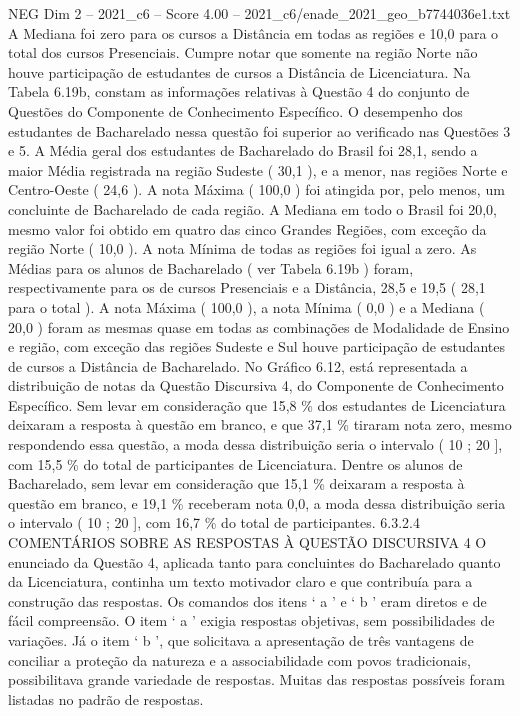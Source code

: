 \begin{textsample}{NEG Dim 2 – 2021\_c6 – Score 4.00 – 2021\_c6/enade\_2021\_geo\_b7744036e1.txt}
A Mediana foi zero para os cursos a Distância em todas as regiões e 10,0 para o total dos cursos Presenciais.
Cumpre notar que somente na região Norte não houve participação de estudantes de cursos a Distância de Licenciatura.
Na Tabela 6.19b, constam as informações relativas à Questão 4 do conjunto de Questões do Componente de Conhecimento Específico.
O desempenho dos estudantes de Bacharelado nessa questão foi superior ao verificado nas Questões 3 e 5.
A Média geral dos estudantes de Bacharelado do Brasil foi 28,1, sendo a maior Média registrada na região Sudeste ( 30,1 ), e a menor, nas regiões Norte e Centro-Oeste ( 24,6 ).
A nota Máxima ( 100,0 ) foi atingida por, pelo menos, um concluinte de Bacharelado de cada região.
A Mediana em todo o Brasil foi 20,0, mesmo valor foi obtido em quatro das cinco Grandes Regiões, com exceção da região Norte ( 10,0 ).
A nota Mínima de todas as regiões foi igual a zero.
As Médias para os alunos de Bacharelado ( ver Tabela 6.19b ) foram, respectivamente para os de cursos Presenciais e a Distância, 28,5 e 19,5 ( 28,1 para o total ).
A nota Máxima ( 100,0 ), a nota Mínima ( 0,0 ) e a Mediana ( 20,0 ) foram as mesmas quase em todas as combinações de Modalidade de Ensino e região, com exceção das regiões Sudeste e Sul houve participação de estudantes de cursos a Distância de Bacharelado.
No Gráfico 6.12, está representada a distribuição de notas da Questão Discursiva 4, do Componente de Conhecimento Específico.
Sem levar em consideração que 15,8 \% dos estudantes de Licenciatura deixaram a resposta à questão em branco, e que 37,1 \% tiraram nota zero, mesmo respondendo essa questão, a moda dessa distribuição seria o intervalo ( 10 ; 20 ], com 15,5 \% do total de participantes de Licenciatura.
Dentre os alunos de Bacharelado, sem levar em consideração que 15,1 \% deixaram a resposta à questão em branco, e 19,1 \% receberam nota 0,0, a moda dessa distribuição seria o intervalo ( 10 ; 20 ], com 16,7 \% do total de participantes. 6.3.2.4 COMENTÁRIOS SOBRE AS RESPOSTAS À QUESTÃO DISCURSIVA 4 O enunciado da Questão 4, aplicada tanto para concluintes do Bacharelado quanto da Licenciatura, continha um texto motivador claro e que contribuía para a construção das respostas.
Os comandos dos itens ‘ a ’ e ‘ b ’ eram diretos e de fácil compreensão.
O item ‘ a ’ exigia respostas objetivas, sem possibilidades de variações.
Já o item ‘ b ’, que solicitava a apresentação de três vantagens de conciliar a proteção da natureza e a associabilidade com povos tradicionais, possibilitava grande variedade de respostas.
Muitas das respostas possíveis foram listadas no padrão de respostas.

\end{textsample}
